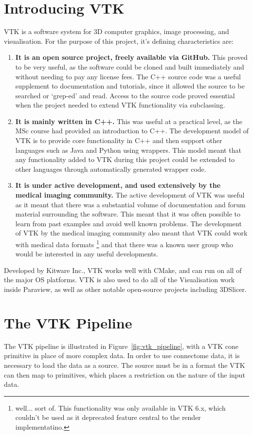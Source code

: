 \documentclass[MSc,paper=a4,pagesize=auto]{icldt}
\begin{document}
\section{Introducing VTK}
VTK is a software system for 3D computer graphics, image processing, and visualisation. For the purpose of this project, it's defining characteristics are:
\begin{enumerate}
\item \textbf{It is an open source project, freely available via GitHub.} This proved to be very useful, as the software could be cloned and built immediately and without needing to pay any license fees. The C++ source code was a useful supplement to documentation and tutorials, since it allowed the source to be searched or `grep-ed' and read. Access to the source code proved essential when the project needed to extend VTK functionality via subclassing. 
\item \textbf{It is mainly written in C++.} This was useful at a practical level, as the MSc course had provided an introduction to C++. The development model of VTK is to provide core functionality in C++ and then support other languages such as Java and Python using wrappers. This model meant that any functionality added to VTK during this project could be extended to other languages through automatically generated wrapper code.
\item \textbf{It is under active development, and used extensively by the medical imaging community.} The active development of VTK was useful as it meant that there was a substantial volume of documentation and forum material surrounding the software. This meant that it was often possible to learn from past examples and avoid well known problems. The development of VTK by the medical imaging community also meant that VTK could work with medical data formats \footnote{well... sort of. This functionality was only available in VTK 6.x, which couldn't be used as it deprecated feature central to the render implementatino.} and that there was a known user group who would be interested in any useful developments.
\end{enumerate}

Developed by Kitware Inc., VTK works well with CMake, and can run on all of the major OS platforms. VTK is also used to do all of the Visualisation work inside Paraview, as well as other notable open-source projects including 3DSlicer.

\section{The VTK Pipeline}
The VTK pipeline is illustrated in Figure~\ref{fig:vtk_pipeline}, with a VTK cone primitive in place of more complex data. In order to use connectome data, it is necessary to load the data as a source. The source must be in a format the VTK can then map to primitives, which places a restriction on the nature of the input data.
\end{document}
